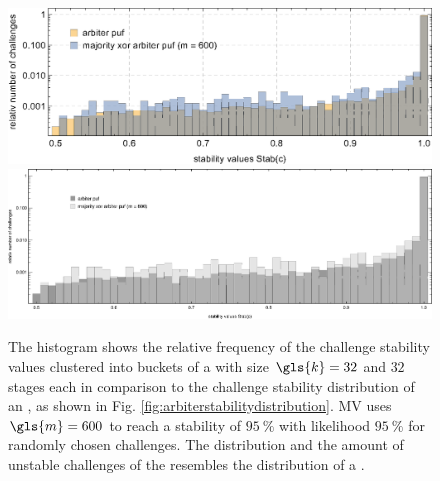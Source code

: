 \begin{figure}[ht]
\ifx{}\undefined
{}
\else
	\if{}
\centering
\includegraphics[width=1.00\textwidth]{images/comparison-arbiter-stability-distribution-majority-xor-stability-distribution.eps}
	\else
\includegraphics[width=1.00\textwidth]{images/comparison-arbiter-stability-distribution-majority-xor-stability-distribution-mono.eps}  
    \fi
\fi
\caption[Challenge stability distribution of a Majority \acs{XOR} \apuf]{The histogram shows the relative frequency of the challenge stability values clustered into buckets of a \mxpuf with size $\gls{k} = 32$ and $32$ stages each in comparison to the challenge stability distribution of an \apuf, as shown in Fig. \ref{fig:arbiterstabilitydistribution}. \ac{MV} uses $\gls{m} = 600$ to reach a stability of $95\ \%$ with likelihood $95\ \%$ for randomly chosen challenges. The distribution and the amount of unstable challenges of the \mxpuf resembles the distribution of a \apuf.} 
\label{fig:comparisonarbiterstabilitydistributionmajorityxorstabilitydistribution}
\end{figure}












